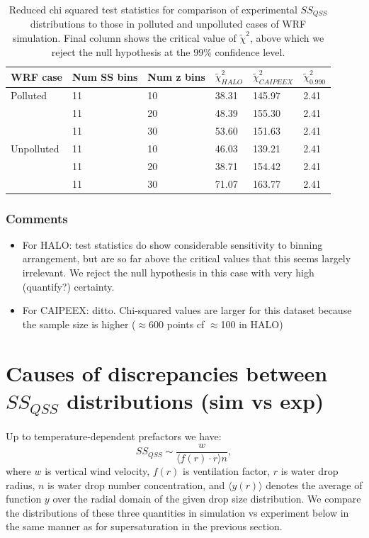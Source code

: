 \documentclass{article}
\begin{document}
\begin{table}[ht]
\centering
\begin{tabular}{@{}llllll@{}}
\toprule
\textbf{WRF case} & \textbf{Num SS bins} & \textbf{Num z bins} & \textbf{$\tilde\chi^2_{HALO}$} & \textbf{$\tilde\chi^2_{CAIPEEX}$} & \textbf{$\tilde\chi^2_{0.990}$} \\ \midrule
Polluted & 11 & 10 & 38.31 & 145.97 & 2.41 \\
 & 11 & 20 & 48.39 & 155.30 & 2.41 \\
 & 11 & 30 & 53.60 & 151.63 & 2.41 \\
Unpolluted & 11 & 10 & 46.03 & 139.21 & 2.41 \\
 & 11 & 20 & 38.71 & 154.42 & 2.41 \\
 & 11 & 30 & 71.07 & 163.77 & 2.41 \\ \bottomrule
\end{tabular}
\caption{Reduced chi squared test statistics for comparison of experimental $SS_{QSS}$ distributions to those in polluted and unpolluted cases of WRF simulation. Final column shows the critical value of $\tilde\chi^2$, above which we reject the null hypothesis at the 99\% confidence level.}
\label{chisqssqss}
\end{table}

\subsubsection{Comments}
\begin{itemize}
	\item For HALO: test statistics do show considerable sensitivity to binning arrangement, but are so far above the critical values that this seems largely irrelevant. We reject the null hypothesis in this case with very high (quantify?) certainty.
	\item For CAIPEEX: ditto. Chi-squared values are larger for this dataset because the sample size is higher ($\approx$600 points cf $\approx$100 in HALO)
\end{itemize}

\section{Causes of discrepancies between $SS_{QSS}$ distributions (sim vs exp)}

Up to temperature-dependent prefactors we have:
\begin{equation}
SS_{QSS} \sim \frac{w}{\langle f(r)\cdot r \rangle n},
\end{equation}
where $w$ is vertical wind velocity, $f(r)$ is ventilation factor, $r$ is water drop radius, $n$ is water drop number concentration, and $\langle y(r) \rangle$ denotes the average of function $y$ over the radial domain of the given drop size distribution. We compare the distributions of these three quantities in simulation vs experiment below in the same manner as for supersaturation in the previous section.
\end{document}
